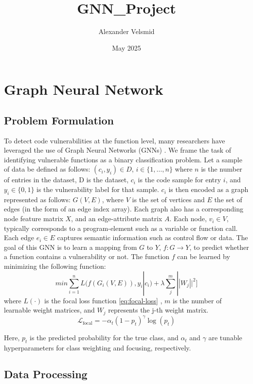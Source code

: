\documentclass{article}
\title{GNN_Project}
\author{Alexander Velsmid}
\date{May 2025}
\begin{document}
\section{Graph Neural Network}

\subsection{Problem Formulation}
To detect code vulnerabilities at the function level, many researchers have leveraged the use of Graph Neural Networks (GNNs) \cite{ample, devign}. We frame the task of identifying vulnerable functions as a binary classification problem. Let a sample of data be defined as follows: 
\((c_i, y_i) \in D\), \( i \in \{1, \ldots, n\} \) where $n$ is the number of entries in the dataset, D is the dataset, $c_i$ is the code sample for entry $i$, and $y_i \in \{0, 1\}$ is the vulnerability label for that sample. $c_i$ is then encoded as a graph represented as follows: $G(V, E)$, where $V$ is the set of vertices and $E$ the set of edges (in the form of an edge index array). Each graph also has a corresponding node feature matrix $X$, and an edge-attribute matrix $A$. Each node, $v_i \in V$, typically corresponds to a program-element such as a variable or function call. Each edge $e_i \in E$ captures semantic information such as control flow or data. The goal of this GNN is to learn a mapping from $G$ to $Y$, $f: G \to Y$, to predict whether a function contains a vulnerability or not. The function $f$ can be learned by minimizing the following function:
\[min\sum_{i=1}^{n}L(f(G_i(V, E)), y_i | c_i) + \lambda \sum_j^m||W_j||^2] \]
where $L(\cdot)$ is the focal loss function \eqref{eq:focal-loss} \cite{focalloss} , $m$ is the number of learnable weight matrices, and $W_j$ represents the j-th weight matrix.
\begin{equation}
\mathcal{L}_{\text{focal}} = -\alpha_t (1 - p_t)^\gamma \log(p_t)
\label{eq:focal-loss}
\end{equation}

Here, $p_t$ is the predicted probability for the true class, and $\alpha_t$ and $\gamma$ are tunable hyperparameters for class weighting and focusing, respectively.


\subsection{Data Processing}
\end{document}
